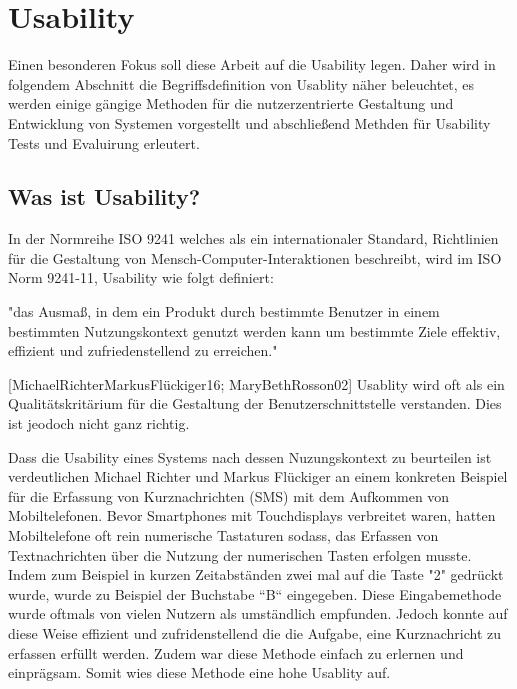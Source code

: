 \section{Usability}

Einen besonderen Fokus soll diese Arbeit auf die Usability legen. Daher wird in folgendem Abschnitt die Begriffsdefinition von Usablity näher beleuchtet, es werden einige 
gängige Methoden für die nutzerzentrierte Gestaltung und Entwicklung von Systemen vorgestellt und abschließend Methden für Usability Tests und Evaluirung erleutert. 

\subsection{Was ist Usability?}

In der Normreihe ISO 9241 welches als ein internationaler Standard, Richtlinien für die Gestaltung von Mensch-Computer-Interaktionen beschreibt, wird im ISO Norm 9241-11,  Usability wie folgt definiert:

"das Ausmaß, in dem ein Produkt durch bestimmte Benutzer in einem bestimmten Nutzungskontext genutzt werden kann um bestimmte Ziele effektiv, effizient und zufriedenstellend zu erreichen."

[MichaelRichterMarkusFlückiger16; MaryBethRosson02] Usablity wird  oft als ein Qualitätskritärium für die Gestaltung der Benutzerschnittstelle verstanden. Dies ist jeodoch nicht ganz richtig.

Dass die Usability eines Systems nach dessen Nuzungskontext zu beurteilen ist verdeutlichen Michael Richter und Markus Flückiger an einem konkreten Beispiel für die Erfassung 
von Kurznachrichten (SMS) mit dem Aufkommen von Mobiltelefonen.  Bevor Smartphones mit Touchdisplays verbreitet waren, hatten Mobiltelefone oft rein numerische Tastaturen sodass, das Erfassen 
von Textnachrichten über die Nutzung der numerischen Tasten erfolgen musste. Indem zum Beispiel in kurzen Zeitabständen zwei mal auf die Taste "2" gedrückt wurde, wurde zu Beispiel der Buchstabe ``B`` eingegeben. 
Diese Eingabemethode wurde oftmals von vielen Nutzern als umständlich empfunden. Jedoch konnte auf diese Weise effizient und zufridenstellend die die Aufgabe, eine Kurznachricht zu erfassen erfüllt werden. 
Zudem war diese Methode einfach zu erlernen und einprägsam. Somit wies diese Methode eine hohe Usablity auf. 

